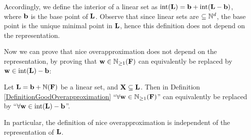 Accordingly, we define the interior of a linear set as \(\operatorname{int}(\mathbf{L})=\mathbf{b}+\operatorname{int}(\mathbf{L}-\mathbf{b})\), where \(\mathbf{b}\) is the base point of \(\mathbf{L}\). Observe that since linear sets are \(\subseteq \mathbb{N}^d\), the base point is the unique minimal point in \(\mathbf{L}\), hence this definition does not depend on the representation. 

Now we can prove that nice overapproximation does not depend on the representation, by proving that \(\mathbf{w} \in \mathbb{N}_{\geq 1}(\mathbf{F})\) can equivalently be replaced by \(\mathbf{w} \in \operatorname{int}(\mathbf{L})-\mathbf{b}\):

\begin{lemma} \label{LemmaIndependentOfRepresentationOfL}
Let \(\mathbf{L}=\mathbf{b}+\mathbb{N}(\mathbf{F})\) be a linear set, and \(\mathbf{X} \subseteq \mathbf{L}\). Then in Definition \ref{DefinitionGoodOverapproximation} ``\(\forall \mathbf{w} \in \mathbb{N}_{\geq 1}(\mathbf{F})\)'' can equivalently be replaced by ``\(\forall \mathbf{w} \in \operatorname{int}(\mathbf{L})-\mathbf{b}\)''. 

In particular, the definition of nice overapproximation is independent of the representation of \(\mathbf{L}\).
\end{lemma}

